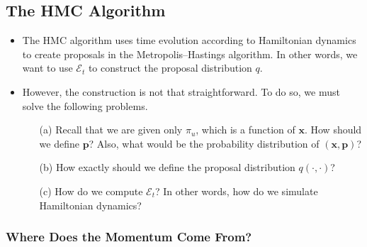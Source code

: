 \documentclass[10pt]{article}
\newcommand{\ve}[1]{\mathbf{#1}}
\newcommand{\mcal}[1]{\mathcal{#1}}
\begin{document}
\subsection{The HMC Algorithm}

\begin{itemize}
  \item The HMC algorithm uses time evolution according to Hamiltonian dynamics to create proposals in the Metropolis--Hastings algorithm. In other words, we want to use $\mcal{E}_t$ to construct the proposal distribution $q$.
  
  \item However, the construction is not that straightforward. To do so, we must solve the following problems.
  \begin{enumerate}
    \item[(a)] Recall that we are given only $\pi_u$, which is a function of $\ve{x}$. How should we define $\ve{p}$? Also, what would be the probability distribution of $(\ve{x},\ve{p})$?
    
    \item[(b)] How exactly should we define the proposal distribution $q(\cdot, \cdot)$?
    
    \item[(c)] How do we compute $\mcal{E}_t$? In other words, how do we simulate Hamiltonian dynamics?
  \end{enumerate}
\end{itemize}

\subsubsection{Where Does the Momentum Come From?}
\end{document}
